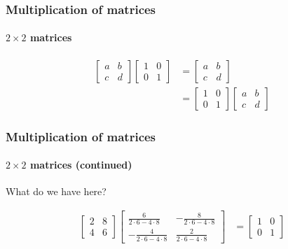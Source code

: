 \documentclass[xcolor=dvipsnames]{beamer}
\begin{document}
\begin{frame}
\frametitle{Multiplication of matrices}
\framesubtitle{$2 \times 2$ matrices}

  \begin{align*}
    \left[ \begin{array}{rr}
      a & b \\
      c & d
      \end{array} \right]
    \left[ \begin{array}{rr}
      1 & 0 \\
      0 & 1
      \end{array} \right]
    & = 
    \left[ \begin{array}{rr}
      a & b \\
      c & d
      \end{array} \right] \\
    & = 
    \left[ \begin{array}{rr}
      1 & 0 \\
      0 & 1
      \end{array} \right]
    \left[ \begin{array}{rr}
      a & b \\
      c & d
      \end{array} \right]
    \end{align*}

  \end{frame}

\begin{frame}
\frametitle{Multiplication of matrices}
\framesubtitle{$2 \times 2$ matrices (continued)}

  What do we have here?

  \begin{align*}
    \left[ \begin{array}{rr}
      2 & 8 \\
      4 & 6
      \end{array} \right]
    \left[ \begin{array}{rr}
      \frac{6}{2 \cdot 6 - 4 \cdot 8} & -\frac{8}{2 \cdot 6 - 4 \cdot 8} \\
      -\frac{4}{2 \cdot 6 - 4 \cdot 8} & \frac{2}{2 \cdot 6 - 4 \cdot 8}
      \end{array} \right]
    & = 
    \left[ \begin{array}{rr}
      1 & 0 \\
      0 & 1
      \end{array} \right]
    \end{align*}

  \end{frame}
\end{document}
